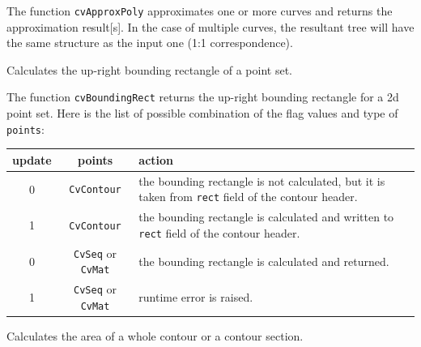 The function \texttt{cvApproxPoly} approximates one or more curves and returns the approximation result[s]. In the case of multiple curves, the resultant tree will have the same structure as the input one (1:1 correspondence).

\label{BoundingRect}

Calculates the up-right bounding rectangle of a point set.


\begin{description}
\end{description}

The function \texttt{cvBoundingRect} returns the up-right bounding rectangle for a 2d point set.
Here is the list of possible combination of the flag values and type of \texttt{points}:

\begin{tabular}{|c|c|p{3in}|}
\hline
update & points & action \\ \hline
0 & \texttt{CvContour\*} & the bounding rectangle is not calculated, but it is taken from \texttt{rect} field of the contour header.\\ \hline
1 & \texttt{CvContour\*} & the bounding rectangle is calculated and written to \texttt{rect} field of the contour header.\\ \hline
0 & \texttt{CvSeq\*} or \texttt{CvMat\*} & the bounding rectangle is calculated and returned.\\ \hline
1 & \texttt{CvSeq\*} or \texttt{CvMat\*} & runtime error is raised.\\ \hline
\end{tabular}

\label{ContourArea}

Calculates the area of a whole contour or a contour section.


\begin{description}
\end{description}

